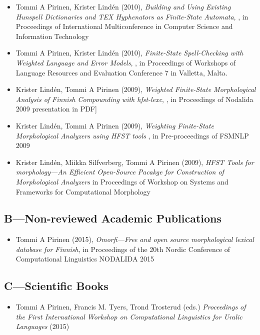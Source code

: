 \documentclass[a4paper]{article}
\begin{document}
\begin{itemize}
\item Tommi A Pirinen, Krister Lindén (2010), \textit{Building and Using Existing Hunspell Dictionaries and TEX Hyphenators as Finite-State Automata}, , in Proceedings of International Multiconference in Computer Science and Information Technology
\item Tommi A Pirinen, Krister Lindén (2010), \textit{Finite-State Spell-Checking with Weighted Language and Error Models}, , in Proceedings of Workshops of Language Resources and Evaluation Conference 7 in Valletta, Malta.
\item Krister Lindén, Tommi A Pirinen (2009), \textit{Weighted Finite-State Morphological Analysis of Finnish Compounding with hfst-lexc}, , in Proceedings of Nodalida 2009 presentation in PDF]
\item Krister Lindén, Tommi A Pirinen (2009), \textit{Weighting Finite-State Morphological Analyzers using HFST tools} , in Pre-proceedings of FSMNLP 2009
\item Krister Lindén, Miikka Silfverberg, Tommi A Pirinen (2009), \textit{HFST Tools for morphology—An Efficient Open-Source Pacakge for Construction of Morphological Analyzers} in Proceedings of Workshop on Systems and Frameworks for Computational Morphology
\end{itemize}

\subsection*{B---Non-reviewed Academic Publications}

\begin{itemize}
\item Tommi A Pirinen (2015), \textit{Omorfi—Free and open source morphological lexical database for Finnish}, in Proceedings of the 20th Nordic Conference of Computational Linguistics NODALIDA 2015
\end{itemize}

\subsection*{C---Scientific Books}

\begin{itemize}
\item Tommi A Pirinen, Francis M. Tyers, Trond Trosterud (eds.) \textit{Proceedings of the First International Workshop on Computational Linguistics for Uralic Languages} (2015)
\end{itemize}
\end{document}
